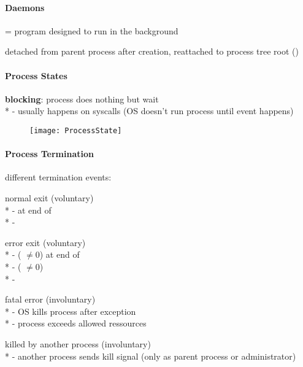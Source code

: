 \paragraph{Daemons}
\begin{items}
  \item = program designed to run in the background
  \item detached from parent process after creation, reattached to process tree root ()
\end{items}

\paragraph{Process States}
\begin{items}
  \item \textbf{blocking}: process does nothing but wait \\*
    - usually happens on syscalls (OS doesn't run process until event happens)
\end{items}

\begin{figure}[H]\centering\label{ProcessState}\texttt{[image: ProcessState]}\end{figure}

\paragraph{Process Termination}
\begin{items}
  \item different termination events: 
  \begin{enumeration}
    \item normal exit (voluntary) \\*
      -  at end of  \\*
      - 
    \item error exit (voluntary) \\*
      -  ( \( \neq 0 \)) at end of  \\*
      -  ( \( \neq 0 \)) \\*
      - 
    \item fatal error (involuntary) \\*
      - OS kills process after exception \\*
      - process exceeds allowed ressources
    \item killed by another process (involuntary) \\*
      - another process sends kill signal (only as parent process or administrator)
  \end{enumeration}
\end{items}

